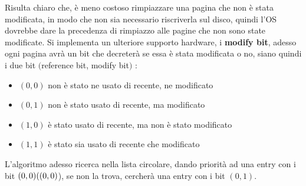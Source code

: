 \documentclass[12pt, letterpaper]{article}
\begin{document}
Risulta chiaro che, è meno costoso rimpiazzare una pagina che non è stata modificata, in modo che non sia necessario riscriverla 
sul disco, quindi l'OS dovrebbe dare la precedenza di rimpiazzo alle pagine che non sono state modificate. Si 
implementa un ulteriore supporto hardware, i \textbf{modify bit}, adesso ogni pagina avrà un bit che decreterà se 
essa è stata modificata o no, siano quindi i due bit \((\)reference bit, modify bit\()\) : \begin{itemize}
    \item \((0,0)\) non è stato ne usato di recente, ne modificato
    \item \((0,1)\) non è stato  usato di recente, ma modificato
    \item \((1,0)\) è stato usato di recente, ma non è stato modificato
    \item \((1,1)\) è stato sia usato di recente che modificato
\end{itemize}
L'algoritmo adesso ricerca nella lista circolare, dando priorità ad una entry con i bit \((0,0)\\((0,0)\)), se non 
la trova, cercherà una entry con i bit \((0,1)\).
\end{document}
